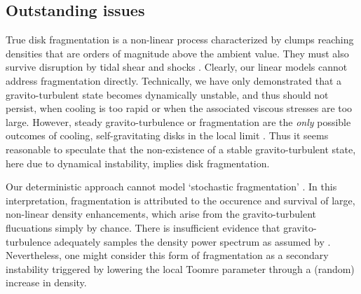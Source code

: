 
\subsection{Outstanding issues}
True disk fragmentation is a non-linear process characterized by
clumps reaching densities that are orders of magnitude above the
ambient value. They must also survive 
disruption by tidal shear and shocks \citep{shlosman87,young16}.  
Clearly, our linear models cannot address fragmentation
directly. Technically, we have only demonstrated that a 
gravito-turbulent state becomes dynamically unstable, and thus should
not persist, when cooling is too rapid or when the associated viscous
stresses are too large.  However, steady gravito-turbulence or 
fragmentation are the \emph{only} possible outcomes of cooling, 
self-gravitating disks in the local limit \citep[][]{gammie01}.    
Thus it seems reasonable to speculate that the non-existence of a stable
gravito-turbulent state, here due to dynamical instability, implies
disk fragmentation.


Our deterministic approach cannot model `stochastic fragmentation'
\citep{paardekooper12,hopkins13}. In this interpretation,  
fragmentation is attributed to the occurence and survival 
of large, non-linear density enhancements, which arise from the
gravito-turbulent flucuations simply by chance. %
There is insufficient evidence that gravito-turbulence adequately samples
the density power spectrum as assumed by \cite{hopkins13}.
Nevertheless, one might consider this form of fragmentation as a secondary instability
triggered by lowering the local 
Toomre parameter through a (random) increase in density. 

